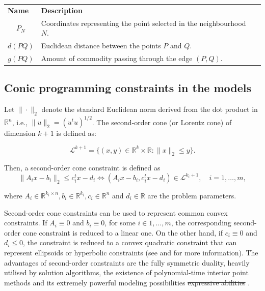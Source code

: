 \documentclass[a4paper,  review, authoryear, 1p.]{elsarticle}
\newcommand{\JP}[1]{{\color{armygreen}#1}}
\newcommand{\CV}[1]{{\color{red}#1}}
\begin{document}
\begin{table}[h!]
\begin{tabular}{|cl|l}
			\multicolumn{1}{|l|}{\textbf{Name}} & \textbf{Description} &  \\ \cline{1-2}
			\multicolumn{1}{|c|}{$P_N$} & Coordinates representing the point selected in the neighbourhood $N$. &  \\ \cline{1-2}
			\multicolumn{1}{|c|}{$d(PQ)$} & Euclidean distance between the points $P$ and $Q$. &  \\ \cline{1-2}
			\multicolumn{1}{|c|}{$g(PQ)$} & Amount of commodity passing through the edge $(P, Q)$. &  \\ \cline{1-2}
		\end{tabular}
	\end{table}
	
	\subsection{Conic programming constraints in the models}
	\CV{
	Let $\|\cdot\|_2$ denote the standard Euclidean norm derived from the dot product in $\mathbb R^n$, i.e., $\|u\|_2= (u^t u)^{1/2}$. The second-order cone (or Lorentz cone) of dimension $k+1$ is defined as:
	
	$$\mathcal L^{k+1}=\{(x, y)\in\mathbb R^k\times\mathbb R : \|x\|_2\leq y\}.$$
	
	Then, a second-order cone constraint is defined as
	\begin{equation*}
		\|A_ix-b_i\|_2\leq c_i^tx -d_i \Leftrightarrow (A_ix-b_i, c_i^t x-d_i)\in \mathcal L^{k_i+1},\quad i=1,\ldots,m,
	\end{equation*}
	
	where $A_i\in\mathbb R^{k_i\times n} , b_i\in\mathbb R^{k_i}, c_i\in \mathbb R^n$ and $d_i\in \mathbb R$ are the problem parameters. 
	
	Second-order cone constraints can be used to represent common convex \JP{constraints}. If $A_i\equiv 0$ and $b_i\equiv 0$,  for some $i\in 1,\ldots, m$, the corresponding second-order cone constraint is reduced to a linear \JP{one}. On the other hand, if $c_i\equiv 0$ and $d_i\leq 0$, the constraint is reduced to a convex quadratic constraint that can represent ellipsoids or hyperbolic constraints (see \citet{lobo1998a} and \citet{boyd2004} for more information). The advantages of second-order constraints are the fully symmetric duality, heavily utilised by solution algorithms, the existence of polynomial-time interior point methods and its extremely powerful \JP{modeling possibilities \sout{expressive abilities}} \citep{nesterov1994a}. }
	
\end{document}
